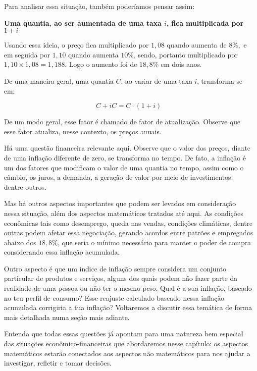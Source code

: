 Para analisar essa situação, também poderíamos pensar assim: 

\begin{center}
\textbf{Uma quantia, ao ser aumentada de uma taxa $i$, fica multiplicada por $1+i$}
\end{center}

Usando essa ideia, o preço fica multiplicado por $1{,}08$ quando aumenta de $8\%,$ e em seguida por $1{,}10$ quando aumenta $10\%$, sendo, portanto multiplicado por $1{,}10\times1{,}08 = 1{,}188$. Logo o aumento foi de $18{,}8\%$ em dois anos.

De uma maneira geral, uma quantia $C$, ao variar de uma taxa $i$, transforma-se em:

$$ C+iC=C\cdot(1+i) $$


De um modo geral, esse fator é chamado de fator de atualização. Observe que esse fator atualiza, nesse contexto, os preços anuais.

Há uma questão financeira relevante aqui. Observe que o valor dos preços, diante de uma inflação diferente de zero, se transforma no tempo. De fato, a inflação é um dos fatores que modificam o valor de uma quantia no tempo, assim como o câmbio, os juros, a demanda, a geração de valor por meio de investimentos, dentre outros.

Mas há outros aspectos importantes que podem ser levados em consideração nessa situação, além dos aspectos matemáticos tratados até aqui. As condições econômicas tais como desemprego, queda nas vendas, condições climáticas, dentre outras podem afetar essa negociação, gerando acordos entre patrões e empregados abaixo dos $18{,}8\%$, que seria o mínimo necessário para manter o poder de compra considerando essa inflação acumulada.

Outro aspecto é que um índice de inflação sempre considera um conjunto particular de produtos e serviços, alguns dos quais podem não fazer parte da realidade de uma pessoa ou não ter o mesmo peso. Qual é a sua inflação, baseado no teu perfil de consumo? Esse reajuste calculado baseado nessa inflação acumulada corrigiria a tua inflação? Voltaremos a discutir essa temática de forma mais detalhada numa seção mais adiante.

Entenda que todas essas questões já apontam para uma natureza bem especial das situações econômico-financeiras que abordaremos nesse capítulo: os aspectos matemáticos estarão conectados aos aspectos não matemáticos para nos ajudar a investigar, refletir e tomar decisões. 

